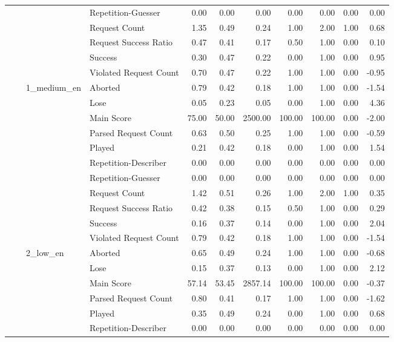 \begin{tabular}{llllrrrrrrr}
 &  &  & Repetition-Guesser & 0.00 & 0.00 & 0.00 & 0.00 & 0.00 & 0.00 & 0.00 \\
 &  &  & Request Count & 1.35 & 0.49 & 0.24 & 1.00 & 2.00 & 1.00 & 0.68 \\
 &  &  & Request Success Ratio & 0.47 & 0.41 & 0.17 & 0.50 & 1.00 & 0.00 & 0.10 \\
 &  &  & Success & 0.30 & 0.47 & 0.22 & 0.00 & 1.00 & 0.00 & 0.95 \\
 &  &  & Violated Request Count & 0.70 & 0.47 & 0.22 & 1.00 & 1.00 & 0.00 & -0.95 \\
\cline{3-11}
 &  & \multirow[t]{11}{*}{1_medium_en} & Aborted & 0.79 & 0.42 & 0.18 & 1.00 & 1.00 & 0.00 & -1.54 \\
 &  &  & Lose & 0.05 & 0.23 & 0.05 & 0.00 & 1.00 & 0.00 & 4.36 \\
 &  &  & Main Score & 75.00 & 50.00 & 2500.00 & 100.00 & 100.00 & 0.00 & -2.00 \\
 &  &  & Parsed Request Count & 0.63 & 0.50 & 0.25 & 1.00 & 1.00 & 0.00 & -0.59 \\
 &  &  & Played & 0.21 & 0.42 & 0.18 & 0.00 & 1.00 & 0.00 & 1.54 \\
 &  &  & Repetition-Describer & 0.00 & 0.00 & 0.00 & 0.00 & 0.00 & 0.00 & 0.00 \\
 &  &  & Repetition-Guesser & 0.00 & 0.00 & 0.00 & 0.00 & 0.00 & 0.00 & 0.00 \\
 &  &  & Request Count & 1.42 & 0.51 & 0.26 & 1.00 & 2.00 & 1.00 & 0.35 \\
 &  &  & Request Success Ratio & 0.42 & 0.38 & 0.15 & 0.50 & 1.00 & 0.00 & 0.29 \\
 &  &  & Success & 0.16 & 0.37 & 0.14 & 0.00 & 1.00 & 0.00 & 2.04 \\
 &  &  & Violated Request Count & 0.79 & 0.42 & 0.18 & 1.00 & 1.00 & 0.00 & -1.54 \\
\cline{3-11}
 &  & \multirow[t]{11}{*}{2_low_en} & Aborted & 0.65 & 0.49 & 0.24 & 1.00 & 1.00 & 0.00 & -0.68 \\
 &  &  & Lose & 0.15 & 0.37 & 0.13 & 0.00 & 1.00 & 0.00 & 2.12 \\
 &  &  & Main Score & 57.14 & 53.45 & 2857.14 & 100.00 & 100.00 & 0.00 & -0.37 \\
 &  &  & Parsed Request Count & 0.80 & 0.41 & 0.17 & 1.00 & 1.00 & 0.00 & -1.62 \\
 &  &  & Played & 0.35 & 0.49 & 0.24 & 0.00 & 1.00 & 0.00 & 0.68 \\
 &  &  & Repetition-Describer & 0.00 & 0.00 & 0.00 & 0.00 & 0.00 & 0.00 & 0.00 \\

\end{tabular}
